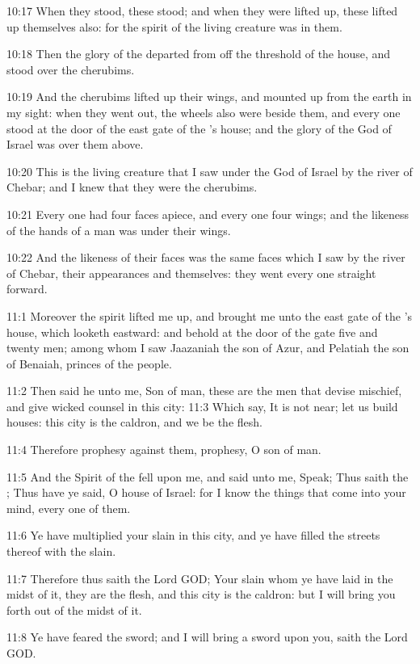 10:17 When they stood, these stood; and when they were lifted up,
these lifted up themselves also: for the spirit of the living creature
was in them.

10:18 Then the glory of the \LORD departed from off the threshold of
the house, and stood over the cherubims.

10:19 And the cherubims lifted up their wings, and mounted up from the
earth in my sight: when they went out, the wheels also were beside
them, and every one stood at the door of the east gate of the \LORD's
house; and the glory of the God of Israel was over them above.

10:20 This is the living creature that I saw under the God of Israel
by the river of Chebar; and I knew that they were the cherubims.

10:21 Every one had four faces apiece, and every one four wings; and
the likeness of the hands of a man was under their wings.

10:22 And the likeness of their faces was the same faces which I saw
by the river of Chebar, their appearances and themselves: they went
every one straight forward.

11:1 Moreover the spirit lifted me up, and brought me unto the east
gate of the \LORD's house, which looketh eastward: and behold at the
door of the gate five and twenty men; among whom I saw Jaazaniah the
son of Azur, and Pelatiah the son of Benaiah, princes of the people.

11:2 Then said he unto me, Son of man, these are the men that devise
mischief, and give wicked counsel in this city: 11:3 Which say, It is
not near; let us build houses: this city is the caldron, and we be the
flesh.

11:4 Therefore prophesy against them, prophesy, O son of man.

11:5 And the Spirit of the \LORD fell upon me, and said unto me, Speak;
Thus saith the \LORD; Thus have ye said, O house of Israel: for I know
the things that come into your mind, every one of them.

11:6 Ye have multiplied your slain in this city, and ye have filled
the streets thereof with the slain.

11:7 Therefore thus saith the Lord GOD; Your slain whom ye have laid
in the midst of it, they are the flesh, and this city is the caldron:
but I will bring you forth out of the midst of it.

11:8 Ye have feared the sword; and I will bring a sword upon you,
saith the Lord GOD.

